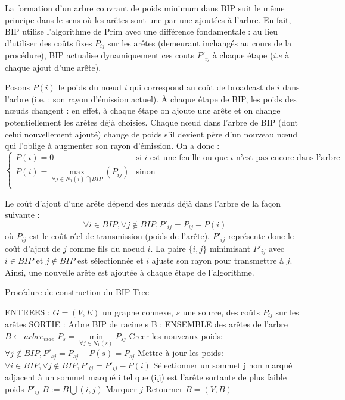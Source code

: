 La formation d'un arbre couvrant de poids minimum dans BIP suit le même principe dans le sens où les arêtes sont une par une ajoutées à l'arbre. En fait, BIP utilise l'algorithme de Prim avec une différence fondamentale : au lieu d'utiliser des coûts fixes $P_{ij}$ sur les arêtes (demeurant inchangés au cours de la procédure), BIP actualise dynamiquement ces couts $P'_{ij}$ à chaque étape ($i.e$ à chaque ajout d'une arête).

Posons $P(i)$ le poids du nœud $i$ qui correspond au coût de broadcast de $i$ dans l'arbre (i.e. : son rayon d'émission actuel). À chaque étape de BIP, les poids des nœuds changent : en effet, à chaque étape on ajoute une arête et on change potentiellement les arêtes déjà choisies. Chaque nœud dans l'arbre de BIP (dont celui nouvellement ajouté) change de poids s'il devient père d'un nouveau nœud qui l'oblige à augmenter son rayon d'émission. On a donc :
$$\begin{cases}
	P(i)=0  & \text{si $i$ est une feuille ou que $i$ n'est pas encore dans l'arbre}\\
	P(i)=\max\limits_{\forall j\in N_1(i)\bigcap BIP}(P_{ij}) & \text{sinon}\\
\end{cases}$$

Le coût d'ajout d'une arête dépend des nœuds déjà dans l'arbre de la façon suivante : 
$$ \forall i \in BIP, \forall j \notin BIP, P'_{ij}=P_{ij}-P(i)$$
où $P_{ij}$ est le coût réel de transmission (poids de l'arête). $P'_{ij}$ représente donc le coût d'ajout de $j$ comme fils du noeud $i$. La paire $\{i,j\}$ minimisant $P'_{ij}$ avec $i \in BIP$ et $j \not\in BIP$ est sélectionnée et $i$ ajuste son rayon pour transmettre à $j$. Ainsi, une nouvelle arête est ajoutée à chaque étape de l'algorithme.\\


\begin{algorithm}[H]
\caption{Procédure de construction du BIP-Tree}
\label{algo_BIP_tree}
\begin{algorithmic}
\STATE ENTREES :  $G=(V,E)$ un graphe connexe, $s$ une source, des coûts $P_{ij}$ sur les arêtes 
\STATE SORTIE : Arbre BIP de racine s
\STATE B : ENSEMBLE des arêtes de l'arbre
\STATE  $B \leftarrow arbre_{vide}$
\STATE $P_s = \min \limits_{\forall j \in N_1(s)}{P_{sj}}$
\STATE Creer les nouveaux poids: $\forall j \notin BIP, P'_{sj}=P_{sj}-P(s)=P_{sj}$
   \STATE Mettre à jour les poids:  $ \forall i \in BIP, \forall j \notin BIP, P'_{ij}=P'_{ij}-P(i)$
   \STATE Sélectionner un sommet j non marqué adjacent à un sommet marqué i tel que (i,j) est l'arête sortante de plus faible poids $P'_{ij}$
   \STATE $B := B\bigcup   {(i,j)}$
   \STATE Marquer $j$
\ENDWHILE
\STATE Retourner $B=(V,B)$
\end{algorithmic}
\end{algorithm}


